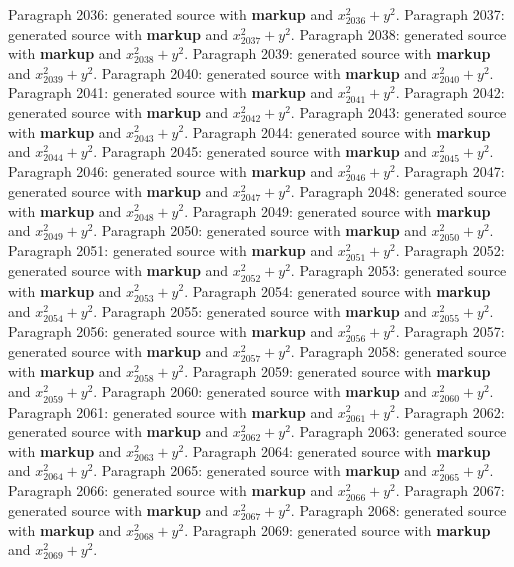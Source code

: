 \documentclass{article}
\begin{document}
Paragraph 2036: generated source with \textbf{markup} and $x_{2036}^2 + y^2$.
Paragraph 2037: generated source with \textbf{markup} and $x_{2037}^2 + y^2$.
Paragraph 2038: generated source with \textbf{markup} and $x_{2038}^2 + y^2$.
Paragraph 2039: generated source with \textbf{markup} and $x_{2039}^2 + y^2$.
Paragraph 2040: generated source with \textbf{markup} and $x_{2040}^2 + y^2$.
Paragraph 2041: generated source with \textbf{markup} and $x_{2041}^2 + y^2$.
Paragraph 2042: generated source with \textbf{markup} and $x_{2042}^2 + y^2$.
Paragraph 2043: generated source with \textbf{markup} and $x_{2043}^2 + y^2$.
Paragraph 2044: generated source with \textbf{markup} and $x_{2044}^2 + y^2$.
Paragraph 2045: generated source with \textbf{markup} and $x_{2045}^2 + y^2$.
Paragraph 2046: generated source with \textbf{markup} and $x_{2046}^2 + y^2$.
Paragraph 2047: generated source with \textbf{markup} and $x_{2047}^2 + y^2$.
Paragraph 2048: generated source with \textbf{markup} and $x_{2048}^2 + y^2$.
Paragraph 2049: generated source with \textbf{markup} and $x_{2049}^2 + y^2$.
Paragraph 2050: generated source with \textbf{markup} and $x_{2050}^2 + y^2$.
Paragraph 2051: generated source with \textbf{markup} and $x_{2051}^2 + y^2$.
Paragraph 2052: generated source with \textbf{markup} and $x_{2052}^2 + y^2$.
Paragraph 2053: generated source with \textbf{markup} and $x_{2053}^2 + y^2$.
Paragraph 2054: generated source with \textbf{markup} and $x_{2054}^2 + y^2$.
Paragraph 2055: generated source with \textbf{markup} and $x_{2055}^2 + y^2$.
Paragraph 2056: generated source with \textbf{markup} and $x_{2056}^2 + y^2$.
Paragraph 2057: generated source with \textbf{markup} and $x_{2057}^2 + y^2$.
Paragraph 2058: generated source with \textbf{markup} and $x_{2058}^2 + y^2$.
Paragraph 2059: generated source with \textbf{markup} and $x_{2059}^2 + y^2$.
Paragraph 2060: generated source with \textbf{markup} and $x_{2060}^2 + y^2$.
Paragraph 2061: generated source with \textbf{markup} and $x_{2061}^2 + y^2$.
Paragraph 2062: generated source with \textbf{markup} and $x_{2062}^2 + y^2$.
Paragraph 2063: generated source with \textbf{markup} and $x_{2063}^2 + y^2$.
Paragraph 2064: generated source with \textbf{markup} and $x_{2064}^2 + y^2$.
Paragraph 2065: generated source with \textbf{markup} and $x_{2065}^2 + y^2$.
Paragraph 2066: generated source with \textbf{markup} and $x_{2066}^2 + y^2$.
Paragraph 2067: generated source with \textbf{markup} and $x_{2067}^2 + y^2$.
Paragraph 2068: generated source with \textbf{markup} and $x_{2068}^2 + y^2$.
Paragraph 2069: generated source with \textbf{markup} and $x_{2069}^2 + y^2$.
\end{document}

